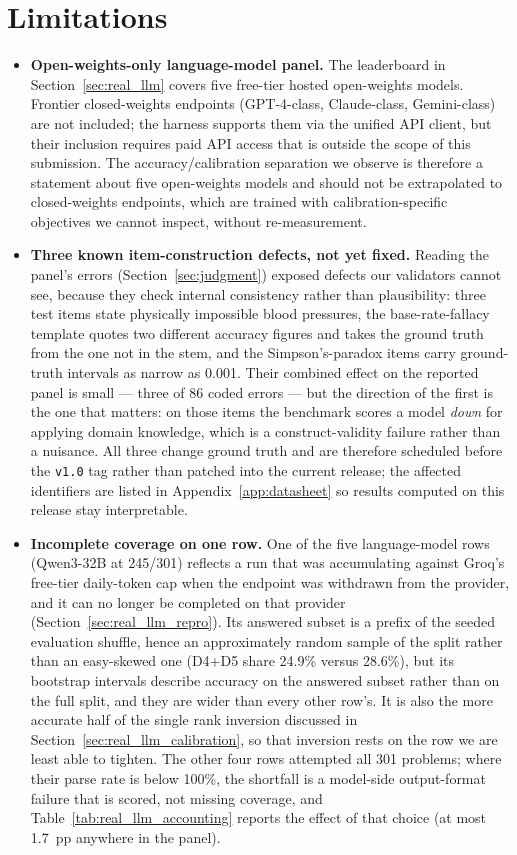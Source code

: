 \documentclass{article}
\begin{document}
\section{Limitations}
\label{sec:limitations}

\begin{itemize}[leftmargin=*,itemsep=3pt]
    \item \textbf{Open-weights-only language-model panel.} The leaderboard in Section~\ref{sec:real_llm} covers five free-tier hosted open-weights models. Frontier closed-weights endpoints (GPT-4-class, Claude-class, Gemini-class) are not included; the harness supports them via the unified API client, but their inclusion requires paid API access that is outside the scope of this submission. The accuracy/calibration separation we observe is therefore a statement about five open-weights models and should not be extrapolated to closed-weights endpoints, which are trained with calibration-specific objectives we cannot inspect, without re-measurement.
    \item \textbf{Three known item-construction defects, not yet fixed.} Reading the panel's errors (Section~\ref{sec:judgment}) exposed defects our validators cannot see, because they check internal consistency rather than plausibility: three test items state physically impossible blood pressures, the base-rate-fallacy template quotes two different accuracy figures and takes the ground truth from the one not in the stem, and the Simpson's-paradox items carry ground-truth intervals as narrow as 0.001. Their combined effect on the reported panel is small --- three of 86 coded errors --- but the direction of the first is the one that matters: on those items the benchmark scores a model \emph{down} for applying domain knowledge, which is a construct-validity failure rather than a nuisance. All three change ground truth and are therefore scheduled before the \texttt{v1.0} tag rather than patched into the current release; the affected identifiers are listed in Appendix~\ref{app:datasheet} so results computed on this release stay interpretable.
    \item \textbf{Incomplete coverage on one row.} One of the five language-model rows (Qwen3-32B at 245/301) reflects a run that was accumulating against Groq's free-tier daily-token cap when the endpoint was withdrawn from the provider, and it can no longer be completed on that provider (Section~\ref{sec:real_llm_repro}). Its answered subset is a prefix of the seeded evaluation shuffle, hence an approximately random sample of the split rather than an easy-skewed one (D4+D5 share 24.9\% versus 28.6\%), but its bootstrap intervals describe accuracy on the answered subset rather than on the full split, and they are wider than every other row's. It is also the more accurate half of the single rank inversion discussed in Section~\ref{sec:real_llm_calibration}, so that inversion rests on the row we are least able to tighten. The other four rows attempted all 301 problems; where their parse rate is below 100\%, the shortfall is a model-side output-format failure that is scored, not missing coverage, and Table~\ref{tab:real_llm_accounting} reports the effect of that choice (at most 1.7~pp anywhere in the panel).

\end{itemize}
\end{document}
